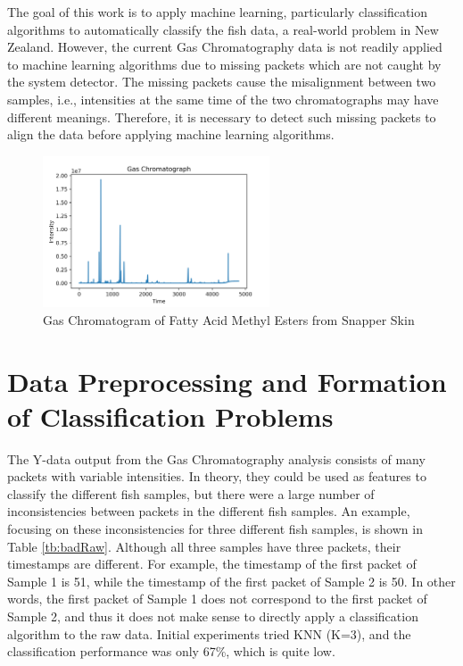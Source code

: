 \documentclass[runningheads]{llncs}
\begin{document}
The goal of this work is to apply machine learning, particularly classification algorithms to automatically classify the fish data, a real-world problem in New Zealand. 
However, the current Gas Chromatography data is not readily applied to machine learning algorithms due to missing packets which are not caught by the system detector. 
The missing packets cause the misalignment between two samples, i.e., intensities at the same time of the two chromatographs may have different meanings. 
Therefore, it is necessary to detect such missing packets to align the data before applying machine learning algorithms. 

\begin{figure}[t]
  \centering
  \includegraphics[width=0.6\textwidth]{chromatograph.png}
  
  \caption{Gas Chromatogram of Fatty Acid Methyl Esters from Snapper Skin}
  \label{fig:gas-chromatography} 
\end{figure}

\section{Data Preprocessing and Formation of Classification Problems}

The Y-data output from the Gas Chromatography analysis consists of many packets with variable intensities. 
In theory, they could be used as features to classify the different fish samples, but there were a large number of inconsistencies between packets in the different fish samples. 
An example, focusing on these inconsistencies for three different fish samples, is shown in Table \ref{tb:badRaw}. 
Although all three samples have three packets, their timestamps are different. 
For example, the timestamp of the first packet of Sample 1 is 51, while the timestamp of the first packet of Sample 2 is 50. 
In other words, the first packet of Sample 1 does not correspond to the first packet of Sample 2, and thus it does not make sense to directly apply a classification algorithm to the raw data. 
Initial experiments tried KNN (K=3), and the classification performance was only 67\%, which is quite low. 
\end{document}
